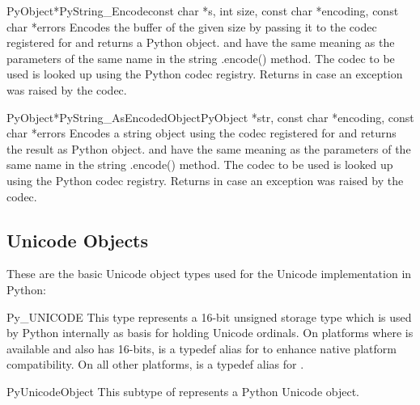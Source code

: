 \documentclass{manual}
\begin{document}
\begin{cfuncdesc}{PyObject*}{PyString_Encode}{const char *s,
                                               int size,
                                               const char *encoding,
                                               const char *errors}
Encodes the  buffer of the given size by passing it to 
the codec registered for  and returns a Python object. 
 and  have the same
meaning as the parameters of the same name in the string .encode()
method. The codec to be used is looked up using the Python codec
registry. Returns \NULL{} in case an exception was raised by the
codec.
\end{cfuncdesc}

\begin{cfuncdesc}{PyObject*}{PyString_AsEncodedObject}{PyObject *str,
                                               const char *encoding,
                                               const char *errors}
Encodes a string object using the codec registered
for  and returns the result as Python 
object.  and  have the same meaning as the
parameters of the same name in the string .encode() method. The codec
to be used is looked up using the Python codec registry. Returns
\NULL{} in case an exception was raised by the codec.
\end{cfuncdesc}


\subsection{Unicode Objects \label{unicodeObjects}}


These are the basic Unicode object types used for the Unicode
implementation in Python:

\begin{ctypedesc}{Py_UNICODE}
This type represents a 16-bit unsigned storage type which is used by
Python internally as basis for holding Unicode ordinals. On platforms
where  is available and also has 16-bits,
 is a typedef alias for  to enhance
native platform compatibility. On all other platforms,
 is a typedef alias for .
\end{ctypedesc}

\begin{ctypedesc}{PyUnicodeObject}
This subtype of  represents a Python Unicode object.
\end{ctypedesc}
\end{document}
